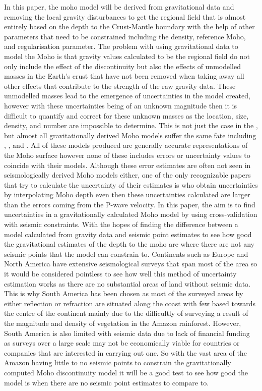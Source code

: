 In this paper, the moho model will be derived from gravitational data and removing the local gravity disturbances to get the regional field that is almost entirely based on the depth to the Crust-Mantle boundary with the help of other parameters that need to be constrained including the density, reference Moho, and regularisation parameter. The problem with using gravitational data to model the Moho is that gravity values calculated to be the regional field do not only include the effect of the discontinuity but also the effects of unmodelled masses in the Earth's crust that have not been removed when taking away all other effects that contribute to the strength of the raw gravity data. These unmodelled masses lead to the emergence of uncertainties in the model created, however with these uncertainties being of an unknown magnitude then it is difficult to quantify and correct for these unknown masses as the location, size, density, and number are impossible to determine. This is not just the case in the \cite{Uieda2016}, but almost all gravitationally derived Moho models suffer the same fate including \cite{vanderMeijde2013}, \cite{Tugume2013}, and \cite{Reguzzoni2015}. All of these models produced are generally accurate representations of the Moho surface however none of these includes errors or uncertainty values to coincide with their models. Although these error estimates are often not seen in seismologically derived Moho models either, one of the only recognizable papers that try to calculate the uncertainty of their estimates is \cite{Szwillus2019} who obtain uncertainties by interpolating Moho depth even then these uncertainties calculated are larger than the errors coming from the P-wave velocity.
In this paper, the aim is to find uncertainties in a gravitationally calculated Moho model by using cross-validation with seismic constraints. With the hopes of finding the difference between a model calculated from gravity data and seismic point estimates to see how good the gravitational estimates of the depth to the moho are where there are not any seismic points that the model can constrain to. Continents such as Europe and North America have extensive seismological surveys that span most of the area so it would be considered pointless to see how well this method of uncertainty estimation works as there are no substantial areas of land without seismic data. This is why South America has been chosen as most of the surveyed areas by either reflection or refraction are situated along the coast with few based towards the centre of the continent mainly due to the difficultly of surveying a result of the magnitude and density of vegetation in the Amazon rainforest. However, South America is also limited with seismic data due to lack of financial funding as surveys over a large scale may not be economically viable for countries or companies that are interested in carrying out one. So with the vast area of the Amazon having little to no seismic points to constrain the gravitationally computed Moho discontinuity model it will be a good test to see how good the model is when there are no seismic point estimates to compare to.
